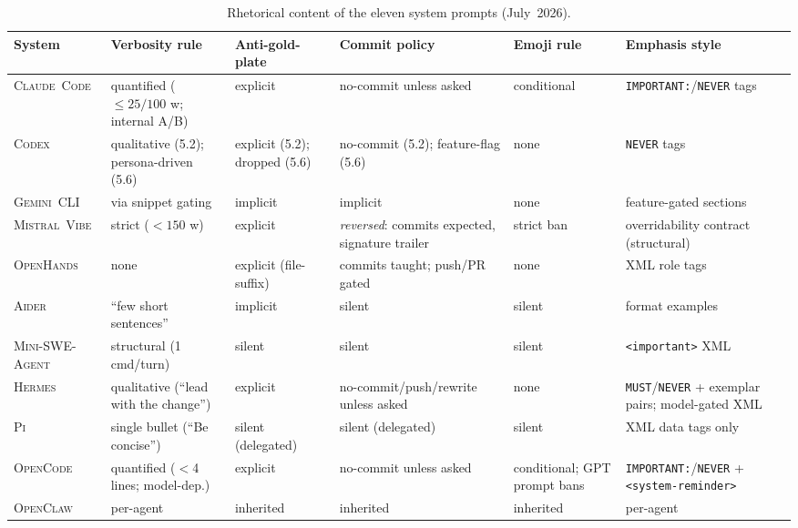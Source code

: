 \documentclass[11pt,a4paper]{article}
\newcommand{\clcode}{\textsc{Claude~Code}\xspace}
\newcommand{\cdx}{\textsc{Codex}\xspace}
\newcommand{\oh}{\textsc{OpenHands}\xspace}
\newcommand{\adr}{\textsc{Aider}\xspace}
\newcommand{\mswe}{\textsc{Mini-SWE-Agent}\xspace}
\newcommand{\ocl}{\textsc{OpenClaw}\xspace}
\newcommand{\vibe}{\textsc{Mistral~Vibe}\xspace}
\newcommand{\gemini}{\textsc{Gemini~CLI}\xspace}
\newcommand{\hrm}{\textsc{Hermes}\xspace}
\newcommand{\pib}{\textsc{Pi}\xspace}
\newcommand{\ocd}{\textsc{OpenCode}\xspace}
\begin{document}
\begin{table}[H]
\centering
\caption{Rhetorical content of the eleven system prompts (July~2026).}
\label{tab:prompt-content}
\scriptsize
\renewcommand{\arraystretch}{1.25}
\begin{tabularx}{\textwidth}{@{}l L{2.5cm} L{2.1cm} L{2.9cm} L{1.7cm} L{2.9cm}@{}}
\toprule
\textbf{System} & \textbf{Verbosity rule} & \textbf{Anti-gold-plate} & \textbf{Commit policy} & \textbf{Emoji rule} & \textbf{Emphasis style} \\
\midrule
\clcode{} & quantified ($\le 25/100$ w; internal A/B) & explicit & no-commit unless asked & conditional & \texttt{IMPORTANT:}/\texttt{NEVER} tags \\
\cdx{}    & qualitative (5.2); persona-driven (5.6) & explicit (5.2); dropped (5.6) & no-commit (5.2); feature-flag (5.6) & none & \texttt{NEVER} tags \\
\gemini{} & via snippet gating & implicit & implicit & none & feature-gated sections \\
\vibe{}   & strict ($<\!150$ w) & explicit & \emph{reversed}: commits expected, signature trailer & strict ban & overridability contract (structural) \\
\oh{}     & none & explicit (file-suffix) & commits taught; push/PR gated & none & XML role tags \\
\adr{}    & ``few short sentences'' & implicit & silent & silent & format examples \\
\mswe{}   & structural (1 cmd/turn) & silent & silent & silent & \texttt{<important>} XML \\
\hrm{}    & qualitative (``lead with the change'') & explicit & no-commit/push/rewrite unless asked & none & \texttt{MUST}/\texttt{NEVER} + exemplar pairs; model-gated XML \\
\pib{}    & single bullet (``Be concise'') & silent (delegated) & silent (delegated) & silent & XML data tags only \\
\ocd{}    & quantified ($<$4 lines; model-dep.) & explicit & no-commit unless asked & conditional; GPT prompt bans & \texttt{IMPORTANT:}/\texttt{NEVER} + \texttt{<system-reminder>} \\
\ocl{}    & per-agent & inherited & inherited & inherited & per-agent \\
\bottomrule
\end{tabularx}
\end{table}
\end{document}
